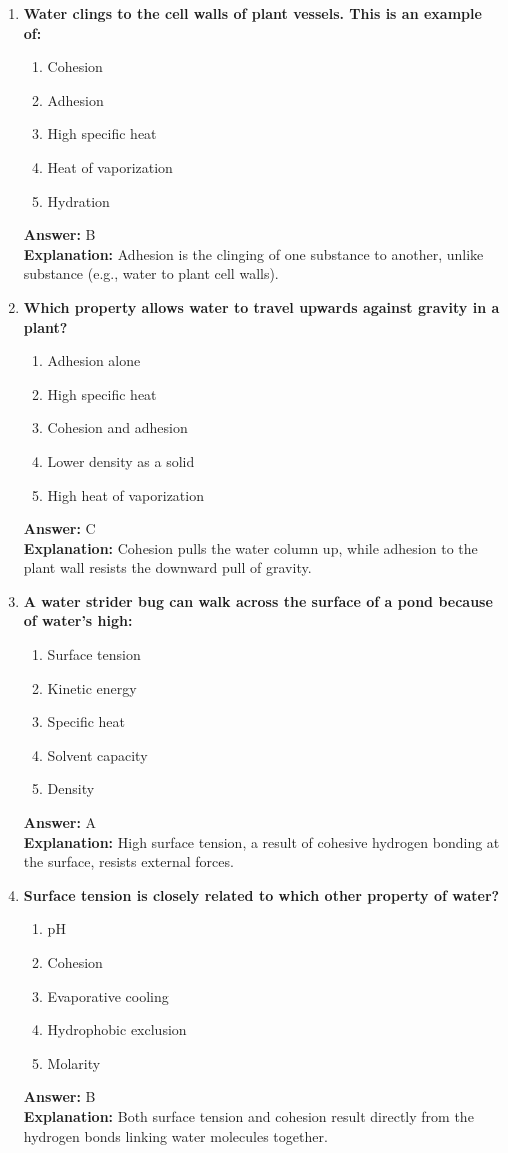 \documentclass[11pt, a4paper]{article}
\begin{document}
\begin{enumerate}
\item \textbf{Water clings to the cell walls of plant vessels. This is an example of:}
\begin{enumerate}[label=\Alph*.]
    \item Cohesion
    \item Adhesion
    \item High specific heat
    \item Heat of vaporization
    \item Hydration
\end{enumerate}
\textbf{Answer:} B \\
\textbf{Explanation:} Adhesion is the clinging of one substance to another, unlike substance (e.g., water to plant cell walls).

\item \textbf{Which property allows water to travel upwards against gravity in a plant?}
\begin{enumerate}[label=\Alph*.]
    \item Adhesion alone
    \item High specific heat
    \item Cohesion and adhesion
    \item Lower density as a solid
    \item High heat of vaporization
\end{enumerate}
\textbf{Answer:} C \\
\textbf{Explanation:} Cohesion pulls the water column up, while adhesion to the plant wall resists the downward pull of gravity.

\item \textbf{A water strider bug can walk across the surface of a pond because of water's high:}
\begin{enumerate}[label=\Alph*.]
    \item Surface tension
    \item Kinetic energy
    \item Specific heat
    \item Solvent capacity
    \item Density
\end{enumerate}
\textbf{Answer:} A \\
\textbf{Explanation:} High surface tension, a result of cohesive hydrogen bonding at the surface, resists external forces.

\item \textbf{Surface tension is closely related to which other property of water?}
\begin{enumerate}[label=\Alph*.]
    \item pH
    \item Cohesion
    \item Evaporative cooling
    \item Hydrophobic exclusion
    \item Molarity
\end{enumerate}
\textbf{Answer:} B \\
\textbf{Explanation:} Both surface tension and cohesion result directly from the hydrogen bonds linking water molecules together.


\end{enumerate}
\end{document}
